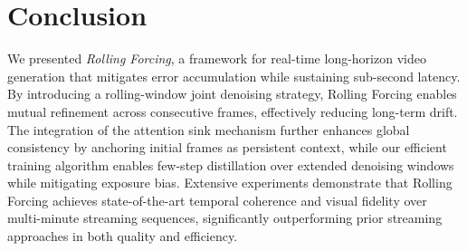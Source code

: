 


\section{Conclusion}

We presented \emph{Rolling Forcing}, a framework for real-time long-horizon video generation that mitigates error accumulation while sustaining sub-second latency. By introducing a rolling-window joint denoising strategy, Rolling Forcing enables mutual refinement across consecutive frames, effectively reducing long-term drift. The integration of the attention sink mechanism further enhances global consistency by anchoring initial frames as persistent context, while our efficient training algorithm enables few-step distillation over extended denoising windows while mitigating exposure bias. Extensive experiments demonstrate that Rolling Forcing achieves state-of-the-art temporal coherence and visual fidelity over multi-minute streaming sequences, significantly outperforming prior streaming approaches in both quality and efficiency.